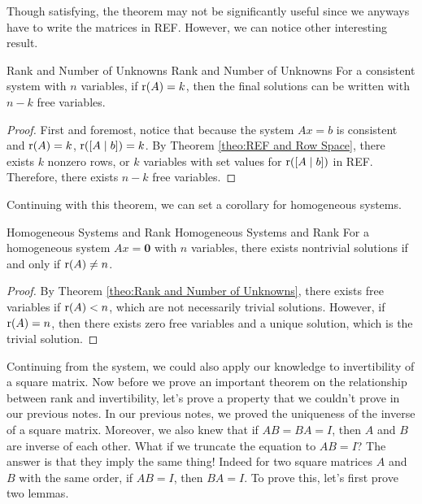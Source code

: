 \documentclass[../main.tex]{subfiles}
\begin{document}
Though satisfying, the theorem may not be significantly useful since
we anyways have to write the matrices in REF. However, we can notice
other interesting result.

\begin{theorem}{Rank and Number of Unknowns}
{Rank and Number of Unknowns}
For a consistent system with $n$ variables, if $\operatorname{r}(A) = k$, then
the final solutions can be written with $n - k$ free variables.
\end{theorem}
\begin{proof}
First and foremost, notice that because the system $Ax = b$ is
consistent and $\operatorname{r}(A) = k$, $\operatorname{r}([A \mid b]) = k$. By Theorem
\ref{theo:REF and Row Space}, there exists $k$ nonzero rows, or $k$
variables with set values for $\operatorname{r}([A \mid b])$ in REF. Therefore,
there exists $n-k$ free variables.
\end{proof}

Continuing with this theorem, we can set a corollary for homogeneous
systems.

\begin{corollary}{Homogeneous Systems and Rank}
{Homogeneous Systems and Rank}
For a homogeneous system $Ax = \mathbf{0}$ with $n$ variables,
there exists nontrivial solutions if and only if $\operatorname{r}(A) \neq n$.
\end{corollary}
\begin{proof}
By Theorem \ref{theo:Rank and Number of Unknowns}, there exists free
variables if $\operatorname{r}(A) < n$, which are not necessarily trivial
solutions. However, if $\operatorname{r}(A) = n$, then there exists zero free
variables and a unique solution, which is the trivial solution.
\end{proof}

Continuing from the system, we could also apply our knowledge to
invertibility of a square matrix. Now before we prove an important
theorem on the relationship between rank and invertibility, let's
prove a property that we couldn't prove in our previous notes.
In our previous notes, we proved the uniqueness of the inverse of
a square matrix. Moreover, we also knew that if $AB = BA = I$, then
$A$ and $B$ are inverse of each other. What if we truncate the
equation to $AB = I$? The answer is that they imply the same thing!
Indeed for two square matrices $A$ and $B$ with the same order,
if $AB = I$, then $BA = I$. To prove this, let's first prove two
lemmas.
\end{document}
